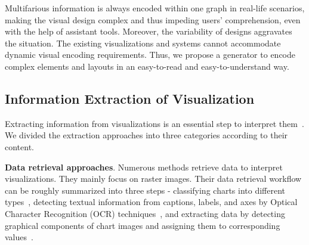  
Multifarious information is always encoded within one graph in real-life scenarios, making the visual design complex and thus impeding users' comprehension, even with the help of assistant tools. Moreover, the variability of designs aggravates the situation. The existing visualizations and systems cannot accommodate dynamic visual encoding requirements. Thus, we propose a generator to encode complex elements and layouts in an easy-to-read and easy-to-understand way.

\subsection{Information Extraction of Visualization}

Extracting information from visualizations is an essential step to interpret them~\cite{DBLP:conf/sibgrapi/MayhuaNHP18, DBLP:conf/pkdd/ClicheRMY17, DBLP:conf/icdar/LeeYWH17}. 
We divided the extraction approaches into three categories according to their content.


\noindent \textbf{Data retrieval approaches}. Numerous methods retrieve data to interpret visualizations. They mainly focus on raster images. Their data retrieval workflow can be roughly summarized into three steps - classifying charts into different types~\cite{DBLP:conf/icip/GaoZB12, DBLP:conf/chi/JungKSHLKS17, DBLP:conf/eccv/SiegelHLDF16, DBLP:journals/vlc/DaiWNZ18}, detecting textual information from captions, labels, and axes by Optical Character Recognition (OCR) techniques~\cite{DBLP:conf/icip/ZhouT00, DBLP:conf/doceng/HuangT07, DBLP:conf/grec/HuangTL03}, and extracting data by detecting graphical components of chart images and assigning them to corresponding values~\cite{8334241, 8226805, Shao2005231}.

